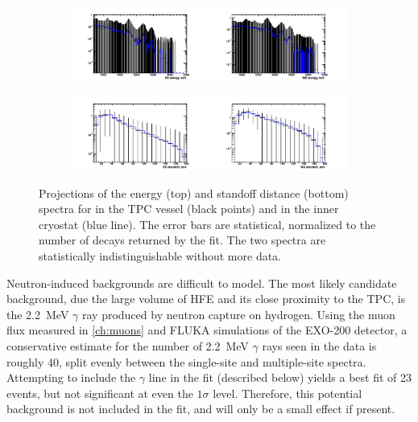 \documentclass[herrin-thesis.tex]{subfiles}
\begin{document}
\begin{figure}[htb]
\centering
\begin{subfigure}[c]{0.7\textwidth}
	\centering
	\includegraphics[width=\textwidth]{./plots/analysis_degenerate_uranium_spectra_e.pdf}
\end{subfigure}
\begin{subfigure}[c]{0.7\textwidth}
	\centering
	\includegraphics[width=\textwidth]{./plots/analysis_degenerate_uranium_spectra_s.pdf}
\end{subfigure}
\caption[Lack of statistical power to distinguish the source of uranium backgrounds]{Projections of the energy (top) and standoff distance (bottom) spectra for  in the TPC vessel (black points) and in the inner cryostat (blue line). The error bars are statistical, normalized to the number of  decays returned by the fit. The two spectra are statistically indistinguishable without more data.}
\label{fig:analysis_degenerate_uranium_spectra}
\end{figure}

Neutron-induced backgrounds are difficult to model. The most likely candidate background, due the large volume of HFE and its close proximity to the TPC, is the \SI{2.2}{\MeV} \(\gamma\) ray produced by neutron capture on hydrogen. Using the muon flux measured in \cref{ch:muons} and FLUKA\cite{Ferrari:2005zk} simulations of the EXO-200 detector, a conservative estimate for the number of \SI{2.2}{\MeV} \(\gamma\) rays seen in the data is roughly 40, split evenly between the single-site and multiple-site spectra. Attempting to include the \(\gamma\) line in the fit (described below) yields a best fit of 23 events, but not significant at even the \(1\sigma\) level. Therefore, this potential background is not included in the fit, and will only be a small effect if present.
\end{document}
